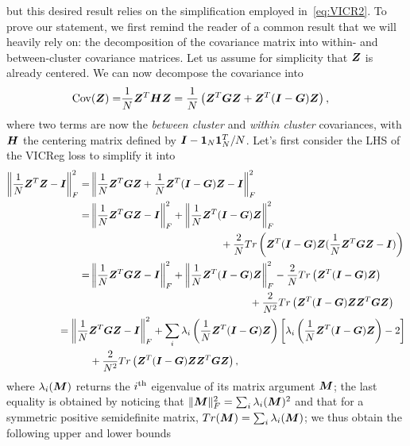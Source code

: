 \documentclass{article} %
\begin{document}
but this desired result relies on the simplification employed in~\eqref{eq:VICR2}.
To prove our statement, we first remind the reader of a common result that we will heavily rely on: the decomposition of the covariance matrix into within- and between-cluster covariance matrices. Let us assume for simplicity that ${\bm{Z}}$ is already centered. We can now decompose the covariance into
\begin{align*}
    \mathrm{Cov}({\bm{Z}})=&\frac{1}{N}{\bm{Z}}^T{\bm{H}}{\bm{Z}}=\frac{1}{N}\left({\bm{Z}}^T{\bm{G}}{\bm{Z}}+{\bm{Z}}^T({\bm{I}}-{\bm{G}}){\bm{Z}}\right),
\end{align*}
where two terms are now the {\em between cluster} and {\em within cluster} covariances, with ${\bm{H}}$ the centering matrix defined by ${\bm{I}}-\mathbf{1}_{N}\mathbf{1}_{N}^T/N$.
Let's first consider the LHS of the VICReg loss to simplify it into
\begin{align*}
     \left\|\frac{1}{N}\mZ^T\mZ-\mI\right\|_F^2=& \left\|\frac{1}{N}\mZ^T\mG\mZ+\frac{1}{N}\mZ^T(\mI-\mG)\mZ-\mI\right\|_F^2\\
    =& \left\|\frac{1}{N}\mZ^T\mG\mZ-\mI\right\|_F^2+ \left\|\frac{1}{N}\mZ^T(\mI-\mG)\mZ\right\|_F^2\\
    &\hspace{4.5cm}+\frac{2}{N} Tr\left(\mZ^T(\mI-\mG)\mZ(\frac{1}{N}\mZ^T\mG\mZ-\mI)\right)\\
    =& \left\|\frac{1}{N}\mZ^T\mG\mZ-\mI\right\|_F^2+ \left\|\frac{1}{N}\mZ^T(\mI-\mG)\mZ\right\|_F^2-\frac{2}{N} Tr\left(\mZ^T(\mI-\mG)\mZ\right)\\
    &\hspace{5.5cm}+\frac{2}{N^2} Tr\left(\mZ^T(\mI-\mG)\mZ\mZ^T\mG\mZ\right)\\
    &\hspace{-1.1cm}= \left\|\frac{1}{N}\mZ^T\mG\mZ-\mI\right\|_F^2+\sum_i \lambda_i \left(\frac{1}{N}\mZ^T(\mI-\mG)\mZ\right)\left[\lambda_i \left(\frac{1}{N}\mZ^T(\mI-\mG)\mZ\right)-2\right]\\
    &+\frac{2}{N^2} Tr\left(\mZ^T(\mI-\mG)\mZ\mZ^T\mG\mZ\right),
\end{align*}
where $\lambda_i({\bm{M}})$ returns the $i^{\rm th}$ eigenvalue of its matrix argument ${\bm{M}}$; the last equality is obtained by noticing that $\| {\bm{M}} \|_F^2 = \sum_i\lambda_i({\bm{M}})^2$ and that for a symmetric positive semidefinite matrix, $Tr({\bm{M}})=\sum_i\lambda_i({\bm{M}})$; we thus obtain the following upper and lower bounds
\end{document}
